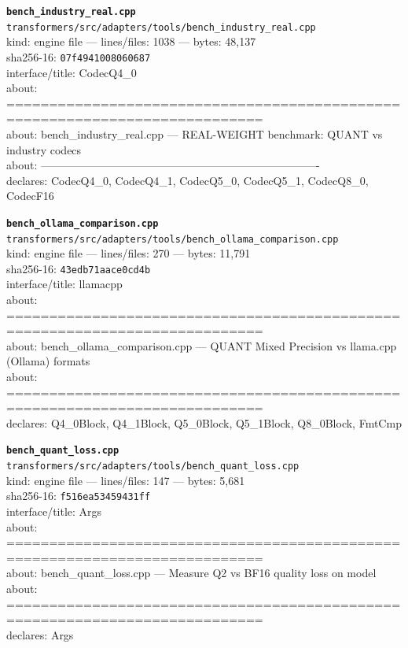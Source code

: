 \noindent\textbf{\texttt{bench\_industry\_real.cpp}}\\
\texttt{transformers/src/adapters/tools/bench\_industry\_real.cpp}\\
kind: engine file --- lines/files: 1038 --- bytes: 48,137\\
sha256-16: \texttt{07f4941008060687}\\
interface/title: CodecQ4\_0\\
about: ============================================================================\\
about: bench\_industry\_real.cpp — REAL-WEIGHT benchmark: QUANT vs industry codecs\\
about: ----------------------------------------------------------------------------\\
declares: CodecQ4\_0, CodecQ4\_1, CodecQ5\_0, CodecQ5\_1, CodecQ8\_0, CodecF16\\
\vspace*{6.0pt}

\noindent\textbf{\texttt{bench\_ollama\_comparison.cpp}}\\
\texttt{transformers/src/adapters/tools/bench\_ollama\_comparison.cpp}\\
kind: engine file --- lines/files: 270 --- bytes: 11,791\\
sha256-16: \texttt{43edb71aace0cd4b}\\
interface/title: llamacpp\\
about: ============================================================================\\
about: bench\_ollama\_comparison.cpp — QUANT Mixed Precision vs llama.cpp (Ollama) formats\\
about: ============================================================================\\
declares: Q4\_0Block, Q4\_1Block, Q5\_0Block, Q5\_1Block, Q8\_0Block, FmtCmp\\
\vspace*{6.0pt}

\noindent\textbf{\texttt{bench\_quant\_loss.cpp}}\\
\texttt{transformers/src/adapters/tools/bench\_quant\_loss.cpp}\\
kind: engine file --- lines/files: 147 --- bytes: 5,681\\
sha256-16: \texttt{f516ea53459431ff}\\
interface/title: Args\\
about: ============================================================================\\
about: bench\_quant\_loss.cpp — Measure Q2 vs BF16 quality loss on model\\
about: ============================================================================\\
declares: Args\\
\vspace*{6.0pt}
\newpage

